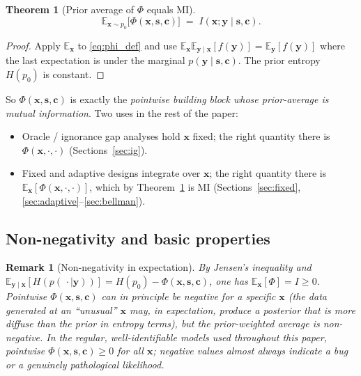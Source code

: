 \documentclass[11pt,a4paper]{article}
\newcommand{\E}{\mathbb{E}}
\newtheorem{theorem}{Theorem}
\newtheorem{remark}{Remark}
\begin{document}
\begin{theorem}[Prior average of $\Phi$ equals MI]
\label{thm:phi_is_mi}
\begin{equation}
  \E_{\bm{x} \sim p_0}\!\bigl[\Phi(\bm{x}, \bm{s}, \bm{c})\bigr] \;=\; I(\bm{x}; \bm{y} \mid \bm{s}, \bm{c}).
  \label{eq:phi_average}
\end{equation}
\end{theorem}

\begin{proof}
Apply $\E_{\bm{x}}$ to \eqref{eq:phi_def} and use $\E_{\bm{x}} \E_{\bm{y}\mid\bm{x}}[f(\bm{y})] = \E_{\bm{y}}[f(\bm{y})]$ where the last expectation is under the marginal $p(\bm{y}\mid\bm{s},\bm{c})$.  The prior entropy $H(p_0)$ is constant.\end{proof}

So $\Phi(\bm{x}, \bm{s}, \bm{c})$ is exactly the \emph{pointwise building block whose prior-average is mutual information}.  Two uses in the rest of the paper:

\begin{itemize}[nosep, leftmargin=2em]
  \item Oracle / ignorance gap analyses hold $\bm{x}$ fixed; the right quantity there is $\Phi(\bm{x}, \cdot, \cdot)$ (Sections~\ref{sec:ig}).
  \item Fixed and adaptive designs integrate over $\bm{x}$; the right quantity there is $\E_{\bm{x}}[\Phi(\bm{x}, \cdot, \cdot)]$, which by Theorem~\ref{thm:phi_is_mi} is MI (Sections~\ref{sec:fixed}, \ref{sec:adaptive}--\ref{sec:bellman}).
\end{itemize}

\subsection{Non-negativity and basic properties}

\begin{remark}[Non-negativity in expectation]
\label{rem:nonneg}
By Jensen's inequality and $\E_{\bm{y}\mid\bm{x}}[H(p(\,\cdot\mid\bm{y}))] = H(p_0) - \Phi(\bm{x},\bm{s},\bm{c})$, one has $\E_{\bm{x}}[\Phi] = I \ge 0$.  Pointwise $\Phi(\bm{x},\bm{s},\bm{c})$ can in principle be negative for a specific $\bm{x}$ (the data generated at an ``unusual'' $\bm{x}$ may, in expectation, produce a posterior that is more diffuse than the prior in entropy terms), but the prior-weighted average is non-negative.  In the regular, well-identifiable models used throughout this paper, pointwise $\Phi(\bm{x},\bm{s},\bm{c}) \ge 0$ for all $\bm{x}$; negative values almost always indicate a bug or a genuinely pathological likelihood.
\end{remark}
\end{document}

